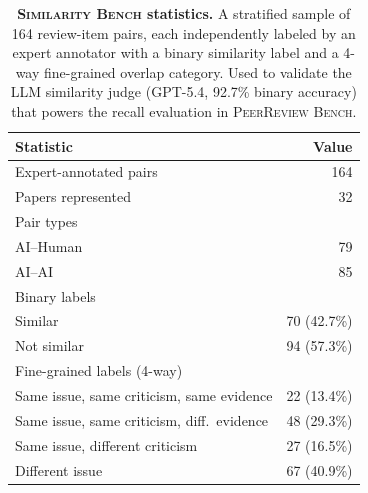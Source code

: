 \begin{table}[t]
\centering
\fontsize{8}{10.5}\selectfont
\setlength{\tabcolsep}{5pt}
\begin{tabular}{lr}
\toprule
\textbf{Statistic} & \textbf{Value} \\
\midrule
Expert-annotated pairs & 164 \\
Papers represented & 32 \\
\midrule
Pair types & \\
\quad AI--Human & 79 \\
\quad AI--AI & 85 \\
\midrule
Binary labels & \\
\quad Similar & 70 (42.7\%) \\
\quad Not similar & 94 (57.3\%) \\
\midrule
Fine-grained labels (4-way) & \\
\quad Same issue, same criticism, same evidence & 22 (13.4\%) \\
\quad Same issue, same criticism, diff.\ evidence & 48 (29.3\%) \\
\quad Same issue, different criticism & 27 (16.5\%) \\
\quad Different issue & 67 (40.9\%) \\
\bottomrule
\end{tabular}
\caption{\textbf{\textsc{Similarity Bench} statistics.}
A stratified sample of 164 review-item pairs, each independently labeled by an expert annotator with a binary similarity label and a 4-way fine-grained overlap category.
Used to validate the LLM similarity judge (GPT-5.4, 92.7\% binary accuracy) that powers the recall evaluation in \textsc{PeerReview Bench}.
}
\label{tab:stats-similarity-bench}
\end{table}
